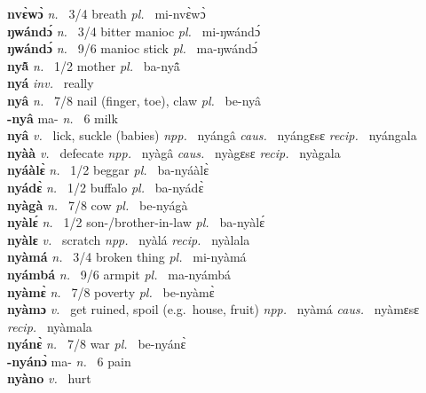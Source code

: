 {\bfseries nvɛ̀wɔ̀}  {\itshape n.~} 3/4 breath {\itshape pl.~} mi-nvɛ̀wɔ̀    \\ 
{\bfseries ŋwándɔ́}  {\itshape n.~} 3/4 bitter manioc {\itshape pl.~} mi-ŋwándɔ́    \\ 
{\bfseries ŋwándɔ́}  {\itshape n.~} 9/6 manioc stick {\itshape pl.~} ma-ŋwándɔ́    \\ 
{\bfseries nyã̂}  {\itshape n.~} 1/2 mother {\itshape pl.~} ba-nyã̂    \\ 
{\bfseries nyá}  {\itshape inv.~} really    \\ 
{\bfseries nyâ}  {\itshape n.~} 7/8 nail (finger, toe), claw {\itshape pl.~} be-nyâ    \\ 
{\bfseries -nyâ} ma- {\itshape n.~} 6 milk    \\ 
{\bfseries nyâ}  {\itshape v.~} lick, suckle (babies)   {\itshape npp.~} nyángâ {\itshape caus.~} nyángɛsɛ {\itshape recip.~} nyángala  \\ 
{\bfseries nyàà}  {\itshape v.~} defecate   {\itshape npp.~} nyàgâ {\itshape caus.~} nyàgɛsɛ {\itshape recip.~} nyàgala  \\ 
{\bfseries nyáàlɛ̀}  {\itshape n.~} 1/2 beggar {\itshape pl.~} ba-nyáàlɛ̀    \\ 
{\bfseries nyádɛ̀}  {\itshape n.~} 1/2 buffalo {\itshape pl.~} ba-nyádɛ̀   \\ 
{\bfseries nyàgà}  {\itshape n.~} 7/8 cow {\itshape pl.~} be-nyágà    \\ 
{\bfseries nyàlɛ́}  {\itshape n.~} 1/2 son-/brother-in-law {\itshape pl.~} ba-nyàlɛ́    \\ 
{\bfseries nyàlɛ}  {\itshape v.~} scratch   {\itshape npp.~} nyàlá {\itshape recip.~} nyàlala  \\ 
{\bfseries nyàmá}  {\itshape n.~} 3/4 broken thing {\itshape pl.~} mi-nyàmá    \\ 
{\bfseries nyámbá}  {\itshape n.~} 9/6 armpit {\itshape pl.~} ma-nyámbá    \\ 
{\bfseries nyàmɛ̀}  {\itshape n.~} 7/8 poverty {\itshape pl.~} be-nyàmɛ̀    \\ 
{\bfseries nyàmɔ}  {\itshape v.~} get ruined, spoil (e.g.\ house, fruit)   {\itshape npp.~} nyàmá {\itshape caus.~} nyàmɛsɛ  {\itshape recip.~} nyàmala  \\ 
{\bfseries nyánɛ̀}  {\itshape n.~} 7/8 war {\itshape pl.~} be-nyánɛ̀    \\ 
{\bfseries -nyánɔ̀} ma- {\itshape n.~} 6 pain    \\ 
{\bfseries nyàno}  {\itshape v.~} hurt   \\ 
